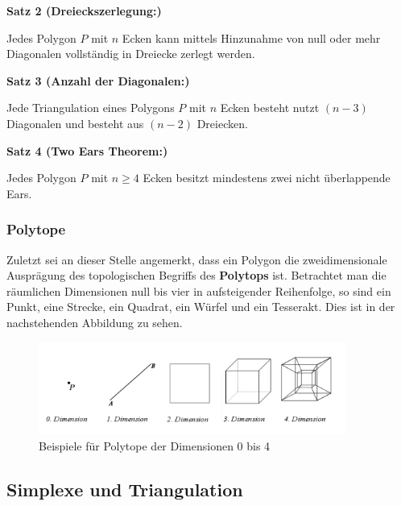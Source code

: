 \begin{flushleft}
{ \textbf{Satz 2 (Dreieckszerlegung:)}
  
  Jedes Polygon $P$ mit $n$ Ecken kann mittels Hinzunahme von null oder mehr Diagonalen vollständig in Dreiecke zerlegt werden. \cite{newAlg}}
\end{flushleft}

\begin{flushleft}
  { \textbf{Satz 3 (Anzahl der Diagonalen:)}
  
  Jede Triangulation eines Polygons $P$ mit $n$ Ecken besteht nutzt $(n-3)$ Diagonalen und besteht aus $(n-2)$ Dreiecken. \cite{newAlg}
}
\end{flushleft}

\begin{flushleft}
  \textbf{Satz 4 (Two Ears Theorem:)}
  
  Jedes Polygon $P$ mit $n \geq 4$ Ecken besitzt mindestens zwei nicht überlappende Ears. \cite{twoears}
\end{flushleft}

\subsubsection{Polytope}
Zuletzt sei an dieser Stelle angemerkt, dass ein Polygon die zweidimensionale Ausprägung des topologischen Begriffs des \textbf{Polytops} ist.
Betrachtet man die räumlichen Dimensionen null bis vier in aufsteigender Reihenfolge, so sind ein Punkt, eine Strecke, ein Quadrat, ein Würfel und ein Tesserakt.
Dies ist in der nachstehenden Abbildung zu sehen.

\begin{figure}[h]
  \centering
  \includegraphics[width=0.9\textwidth]{bilder/Polytope_Dim0_4.png}
  \caption[Beispiele für Polytope der Dimensionen 0 bis 4]{Beispiele für Polytope der Dimensionen 0 bis 4}
  \label{fig:polytope}
\end{figure}

\subsection{Simplexe und Triangulation}

